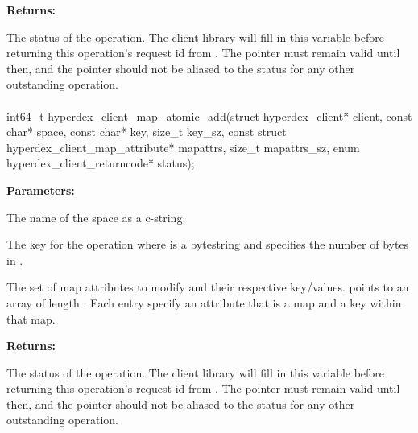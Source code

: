 \noindent\textbf{Returns:}
\begin{description}[labelindent=\widthof{{\code{status}}},leftmargin=*,noitemsep,nolistsep,align=right]
\item[\code{status}] The status of the operation.  The client library will fill in this variable before returning this operation's request id from .  The pointer must remain valid until then, and the pointer should not be aliased to the status for any other outstanding operation.
\end{description}

\paragraph{}
\begin{ccode}
int64_t hyperdex_client_map_atomic_add(struct hyperdex_client* client,
                const char* space,
                const char* key, size_t key_sz,
                const struct hyperdex_client_map_attribute* mapattrs, size_t mapattrs_sz,
                enum hyperdex_client_returncode* status);
\end{ccode}
\funcdesc 

\noindent\textbf{Parameters:}
\begin{description}[labelindent=\widthof{{\code{mapattrs}, \code{mapattrs\_sz}}},leftmargin=*,noitemsep,nolistsep,align=right]
\item[\code{space}] The name of the space as a c-string.
\item[\code{key}, \code{key\_sz}] The key for the operation where  is a bytestring and  specifies the number of bytes in .
\item[\code{mapattrs}, \code{mapattrs\_sz}] The set of map attributes to modify and their respective key/values.   points to an array of length .  Each entry specify an attribute that is a map and a key within that map.
\end{description}

\noindent\textbf{Returns:}
\begin{description}[labelindent=\widthof{{\code{status}}},leftmargin=*,noitemsep,nolistsep,align=right]
\item[\code{status}] The status of the operation.  The client library will fill in this variable before returning this operation's request id from .  The pointer must remain valid until then, and the pointer should not be aliased to the status for any other outstanding operation.
\end{description}

